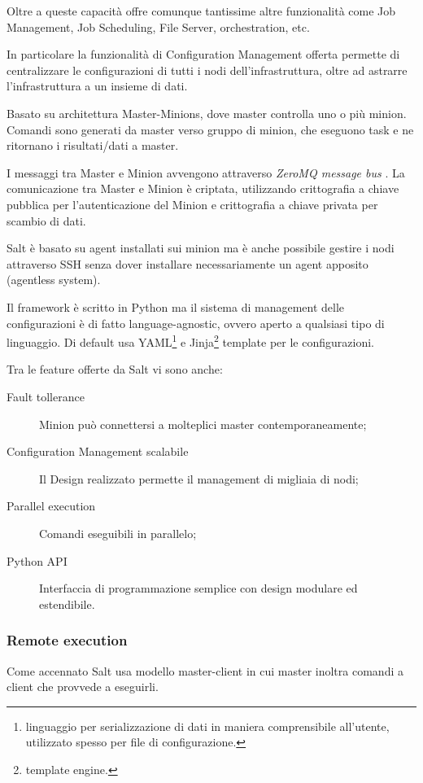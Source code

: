 Oltre a queste capacità offre comunque tantissime altre funzionalità come Job Management, Job Scheduling, File Server, orchestration, etc.


In particolare la funzionalità di Configuration Management offerta permette di centralizzare le configurazioni di tutti i nodi dell'infrastruttura, oltre ad astrarre l'infrastruttura a un insieme di dati.

Basato su architettura Master-Minions, dove master controlla uno o più minion. Comandi sono generati da master verso gruppo di minion, che eseguono task e ne ritornano i risultati/dati a master.

I messaggi tra Master e Minion avvengono attraverso \textit{ZeroMQ message bus} \cite{zeromq}. La comunicazione tra Master e Minion è criptata, utilizzando crittografia a chiave pubblica per l'autenticazione del Minion e  crittografia a chiave privata per scambio di dati.

Salt è basato su agent installati sui  minion ma è anche possibile gestire i nodi attraverso SSH senza dover installare necessariamente un agent apposito (agentless system).

Il framework è scritto in Python ma il sistema di management delle configurazioni è di fatto language-agnostic, ovvero aperto a qualsiasi tipo di linguaggio.
Di default usa YAML\footnote{linguaggio per serializzazione di dati in maniera comprensibile all'utente, utilizzato spesso per file di configurazione.}   \cite{yaml} e Jinja\footnote{template engine.} \cite{jinja} template per le configurazioni.

Tra le feature offerte da Salt vi sono anche:
\begin{description}
    \item[Fault tollerance]  Minion può connettersi a molteplici master contemporaneamente;
    \item[Configuration Management scalabile] Il Design realizzato permette il management di migliaia di nodi;
    \item[Parallel execution] Comandi eseguibili in parallelo;
    \item[Python API] Interfaccia di programmazione semplice con design modulare ed estendibile.
\end{description}



\subsubsection{Remote execution}
Come accennato Salt usa modello master-client in cui master inoltra comandi a client che provvede a eseguirli.


